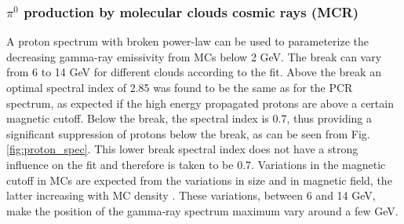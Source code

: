
\subsubsection{$\pi^0$ production by molecular clouds cosmic rays (MCR)}

A proton spectrum with broken power-law can be used to parameterize the decreasing gamma-ray emissivity from MCs below 2 GeV. The break can vary from 6 to 14 GeV for different clouds according to the fit. Above the break an optimal spectral index of 2.85 was found to be the same as for the PCR spectrum, as expected if the high energy propagated protons are above a certain magnetic cutoff. Below the break, the spectral index is 0.7, thus providing a significant suppression of protons below the break, as can be seen from Fig. \ref{fig:proton_spec}. This lower break spectral index does not have a strong influence on the fit and therefore is taken to be 0.7.
Variations in the magnetic cutoff in MCs are expected from the variations in size and in magnetic field, the latter increasing with MC density \cite{Crutcher2012}. 
These variations, between 6 and 14 GeV, make the position of the gamma-ray spectrum maximum vary around a few GeV.


